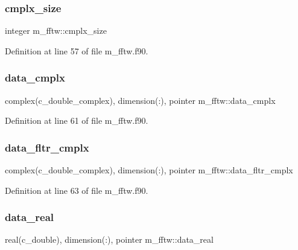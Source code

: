 \subsubsection{\texorpdfstring{cmplx\+\_\+size}{cmplx\_size}}
{\footnotesize\ttfamily integer m\+\_\+fftw\+::cmplx\+\_\+size}



Definition at line 57 of file m\+\_\+fftw.\+f90.

\mbox{\label{namespacem__fftw_a46b5b6c6849f50f0fe5f96301520e981}} 
\subsubsection{\texorpdfstring{data\+\_\+cmplx}{data\_cmplx}}
{\footnotesize\ttfamily complex(c\+\_\+double\+\_\+complex), dimension(\+:), pointer m\+\_\+fftw\+::data\+\_\+cmplx}



Definition at line 61 of file m\+\_\+fftw.\+f90.

\mbox{\label{namespacem__fftw_a2baa49912c2585f5937bcb41804edc3a}} 
\subsubsection{\texorpdfstring{data\+\_\+fltr\+\_\+cmplx}{data\_fltr\_cmplx}}
{\footnotesize\ttfamily complex(c\+\_\+double\+\_\+complex), dimension(\+:), pointer m\+\_\+fftw\+::data\+\_\+fltr\+\_\+cmplx}



Definition at line 63 of file m\+\_\+fftw.\+f90.

\mbox{\label{namespacem__fftw_a5fc31000de6fec8b2dc1a9a1259f8089}} 
\subsubsection{\texorpdfstring{data\+\_\+real}{data\_real}}
{\footnotesize\ttfamily real(c\+\_\+double), dimension(\+:), pointer m\+\_\+fftw\+::data\+\_\+real}



